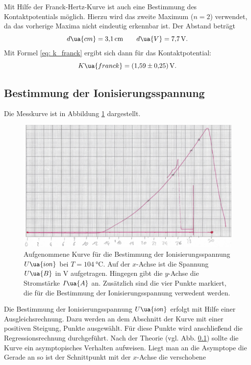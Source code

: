 Mit Hilfe der Franck-Hertz-Kurve ist auch eine Bestimmung des Kontaktpotentials
möglich. Hierzu wird das zweite Maximum ($n=2$) verwendet, da das vorherige Maxima %
nicht eindeutig erkennbar ist. Der Abstand beträgt
\begin{equation*}
  d\ua{cm}=\SI{3.1}{\centi\meter} \qquad d\ua{V}=\SI{7.7}{\volt}.
\end{equation*}
Mit Formel \eqref{eq: k_franck} ergibt sich dann für das Kontaktpotential:
\begin{equation}
  \label{eq:k_frank}
  K\ua{franck}= \SI{1.59\pm0.25}{\volt}.
\end{equation}
\FloatBarrier
\subsection{Bestimmung der Ionisierungsspannung}
\FloatBarrier
Die Messkurve ist in Abbildung \ref{fig: messkurve_ioni} dargestellt.
\begin{figure}
  \centering
  \includegraphics[width=0.8 \textwidth]{./pics/ionisierungsenergie.png}
  \caption{Aufgenommene Kurve für die Bestimmung der Ionisierungsspannung $U\ua{ion}$ bei $T=\SI{104}{\celsius}$. Auf der $x$-Achse ist die Spannung $U\ua{B}$ in $\si{\volt}$ aufgetragen.
          Hingegen gibt die $y$-Achse die Stromstärke $I\ua{A}$ an. Zusätzlich sind die vier Punkte markiert, die für die Bestimmung der Ionisierungsspannung verwedent werden.}
  \label{fig: messkurve_ioni}
\end{figure}
Die Bestimmung der Ionisierungsspannung $U\ua{ion}$ erfolgt mit Hilfe einer Ausgleichsrechnung. Dazu werden an dem Abschnitt der Kurve mit einer positiven Steigung,
Punkte ausgewählt. Für diese Punkte wird anschließend die Regressionsrechnung durchgeführt.
Nach der Theorie (vgl. Abb. \ref{}) sollte die Kurve ein asymptopisches Verhalten aufweisen.
Liegt man an die Asymptope die Gerade an so ist der Schnittpunkt mit der $x$-Achse die verschobene %

